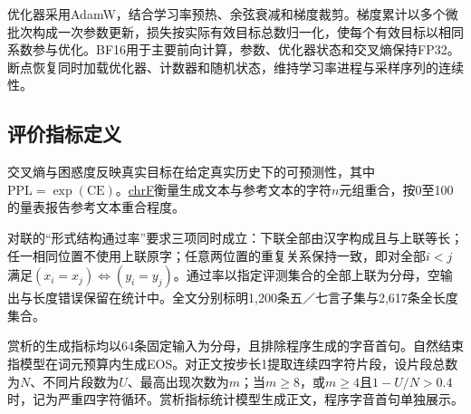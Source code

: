 优化器采用AdamW\cite{adamw}，结合学习率预热、余弦衰减和梯度裁剪。梯度累计以多个微批次构成一次参数更新，损失按实际有效目标总数归一化，使每个有效目标以相同系数参与优化。BF16用于主要前向计算，参数、优化器状态和交叉熵保持FP32。断点恢复同时加载优化器、计数器和随机状态，维持学习率进程与采样序列的连续性。

\subsection{评价指标定义}\label{sec:metrics}

交叉熵与困惑度反映真实目标在给定真实历史下的可预测性，其中$\mathrm{PPL}=\exp(\mathrm{CE})$。\href{https://github.com/mjpost/sacrebleu}{chrF}衡量生成文本与参考文本的字符$n$元组重合\cite{chrf}，按0至100的量表报告参考文本重合程度。

对联的“形式结构通过率”要求三项同时成立：下联全部由汉字构成且与上联等长；任一相同位置不使用上联原字；任意两位置的重复关系保持一致，即对全部$i<j$满足$(x_i=x_j)\Leftrightarrow(y_i=y_j)$。通过率以指定评测集合的全部上联为分母，空输出与长度错误保留在统计中。全文分别标明1,200条五／七言子集与2,617条全长度集合。

赏析的生成指标均以64条固定输入为分母，且排除程序生成的字音首句。自然结束指模型在词元预算内生成EOS。对正文按步长1提取连续四字符片段，设片段总数为$N$、不同片段数为$U$、最高出现次数为$m$；当$m\geq8$，或$m\geq4$且$1-U/N>0.4$时，记为严重四字符循环。赏析指标统计模型生成正文，程序字音首句单独展示。
